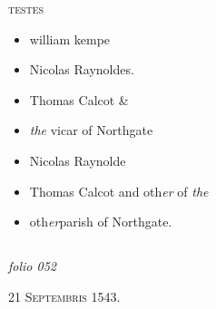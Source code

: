 \documentclass[12pt, a4paper]{book}
\begin{document}
				\begin{center}  {\scshape testes}  \end{center}
			
               		\begin{itemize}
               			\item[]william kempe 
               			\item[]Nicolas Raynoldes.
               			\item[]Thomas Calcot \& 
               		\end{itemize}
               		\begin{itemize}
               			\item[]\textit{the} vicar of Northgate
               			\item[]Nicolas Raynolde
               			\item[]Thomas Calcot and oth\textit{er} of \textit{the}
               			\item[]oth\textit{er}parish of Northgate.
               		\end{itemize}
               	


            
            
\dotfill
						\newpage {} \subsection*{}  \subsection*{}  \subsection*{}

\textit{folio 052}


            
               
				\begin{center} \begin{large} {\scshape 
                  21 Septembris 1543.} \end{large} \end{center}
			
               
               	
\end{document}
